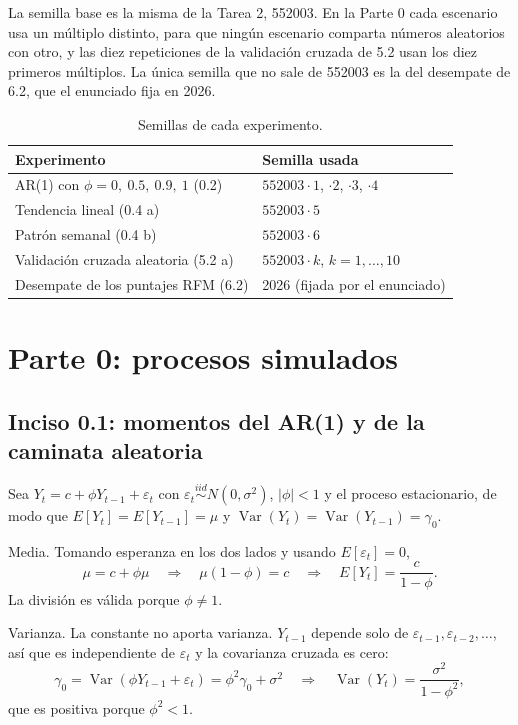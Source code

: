 \documentclass[11pt]{article}
\begin{document}
La semilla base es la misma de la Tarea 2, 552003. En la Parte 0 cada escenario usa un múltiplo
distinto, para que ningún escenario comparta números aleatorios con otro, y las diez
repeticiones de la validación cruzada de 5.2 usan los diez primeros múltiplos. La única semilla
que no sale de 552003 es la del desempate de 6.2, que el enunciado fija en 2026.

\begin{table}[H]
\centering
\caption{Semillas de cada experimento.}\label{tab:semillas}
\begin{tabular}{|l|l|}
\hline
Experimento & Semilla usada \\
\hline
AR(1) con $\phi = 0,\ 0.5,\ 0.9,\ 1$ (0.2) & $552003\cdot 1$, $\cdot 2$, $\cdot 3$, $\cdot 4$ \\
Tendencia lineal (0.4 a) & $552003\cdot 5$ \\
Patrón semanal (0.4 b) & $552003\cdot 6$ \\
Validación cruzada aleatoria (5.2 a) & $552003\cdot k$, $k = 1,\dots,10$ \\
Desempate de los puntajes RFM (6.2) & 2026 (fijada por el enunciado) \\
\hline
\end{tabular}
\end{table}

\section*{Parte 0: procesos simulados}

\subsection*{Inciso 0.1: momentos del AR(1) y de la caminata aleatoria}

Sea $Y_t = c + \phi Y_{t-1} + \varepsilon_t$ con $\varepsilon_t \overset{iid}{\sim} N(0,\sigma^2)$,
$|\phi|<1$ y el proceso estacionario, de modo que $E[Y_t]=E[Y_{t-1}]=\mu$ y
$\operatorname{Var}(Y_t)=\operatorname{Var}(Y_{t-1})=\gamma_0$.

Media. Tomando esperanza en los dos lados y usando $E[\varepsilon_t]=0$,
\[
\mu = c + \phi\mu \quad\Longrightarrow\quad \mu(1-\phi)=c \quad\Longrightarrow\quad
E[Y_t]=\frac{c}{1-\phi}.
\]
La división es válida porque $\phi\neq 1$.

Varianza. La constante no aporta varianza. $Y_{t-1}$ depende solo de
$\varepsilon_{t-1},\varepsilon_{t-2},\dots$, así que es independiente de $\varepsilon_t$ y la
covarianza cruzada es cero:
\[
\gamma_0 = \operatorname{Var}(\phi Y_{t-1}+\varepsilon_t) = \phi^2\gamma_0 + \sigma^2
\quad\Longrightarrow\quad \operatorname{Var}(Y_t)=\frac{\sigma^2}{1-\phi^2},
\]
que es positiva porque $\phi^2<1$.
\end{document}
